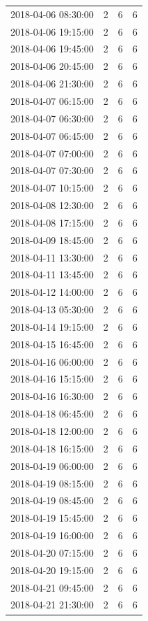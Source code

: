 \begin{tabular}{lrrr}
2018-04-06 08:30:00 & 2 & 6 & 6 \\
2018-04-06 19:15:00 & 2 & 6 & 6 \\
2018-04-06 19:45:00 & 2 & 6 & 6 \\
2018-04-06 20:45:00 & 2 & 6 & 6 \\
2018-04-06 21:30:00 & 2 & 6 & 6 \\
2018-04-07 06:15:00 & 2 & 6 & 6 \\
2018-04-07 06:30:00 & 2 & 6 & 6 \\
2018-04-07 06:45:00 & 2 & 6 & 6 \\
2018-04-07 07:00:00 & 2 & 6 & 6 \\
2018-04-07 07:30:00 & 2 & 6 & 6 \\
2018-04-07 10:15:00 & 2 & 6 & 6 \\
2018-04-08 12:30:00 & 2 & 6 & 6 \\
2018-04-08 17:15:00 & 2 & 6 & 6 \\
2018-04-09 18:45:00 & 2 & 6 & 6 \\
2018-04-11 13:30:00 & 2 & 6 & 6 \\
2018-04-11 13:45:00 & 2 & 6 & 6 \\
2018-04-12 14:00:00 & 2 & 6 & 6 \\
2018-04-13 05:30:00 & 2 & 6 & 6 \\
2018-04-14 19:15:00 & 2 & 6 & 6 \\
2018-04-15 16:45:00 & 2 & 6 & 6 \\
2018-04-16 06:00:00 & 2 & 6 & 6 \\
2018-04-16 15:15:00 & 2 & 6 & 6 \\
2018-04-16 16:30:00 & 2 & 6 & 6 \\
2018-04-18 06:45:00 & 2 & 6 & 6 \\
2018-04-18 12:00:00 & 2 & 6 & 6 \\
2018-04-18 16:15:00 & 2 & 6 & 6 \\
2018-04-19 06:00:00 & 2 & 6 & 6 \\
2018-04-19 08:15:00 & 2 & 6 & 6 \\
2018-04-19 08:45:00 & 2 & 6 & 6 \\
2018-04-19 15:45:00 & 2 & 6 & 6 \\
2018-04-19 16:00:00 & 2 & 6 & 6 \\
2018-04-20 07:15:00 & 2 & 6 & 6 \\
2018-04-20 19:15:00 & 2 & 6 & 6 \\
2018-04-21 09:45:00 & 2 & 6 & 6 \\
2018-04-21 21:30:00 & 2 & 6 & 6 \\

\end{tabular}
